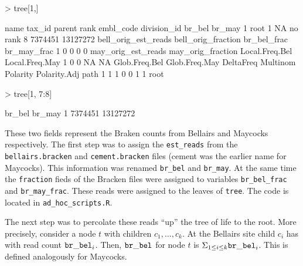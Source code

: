 \documentclass{article}
\begin{document}
\begin{Schunk}
\begin{Sinput}
> tree[1,]
\end{Sinput}
\begin{Soutput}
  name tax_id parent    rank embl_code division_id  br_bel   br_may
1 root      1     NA no rank                     8 7374451 13127272
  bell_orig_est_reads bell_orig_fraction br_bel_frac br_may_frac
1                   0                  0           0           0
  may_orig_est_reads may_orig_fraction Local.Freq.Bel Local.Freq.May
1                  0                 0             NA             NA
  Glob.Freq.Bel Glob.Freq.May DeltaFreq Multinom Polarity Polarity.Adj path
1             1             1         0        0        1            1 root
\end{Soutput}
\begin{Sinput}
> tree[1, 7:8]
\end{Sinput}
\begin{Soutput}
   br_bel   br_may
1 7374451 13127272
\end{Soutput}
\end{Schunk}
These two fields represent the Braken counts from Bellairs and Maycocks respectively. 
The first step was to assign the {\tt est\_reads} from the {\tt bellairs.bracken} and {\tt cement.bracken}
files (cement was the earlier name for Maycocks).
This information was renamed {\tt br\_bel} and {\tt br\_may}.
At the same time the {\tt fraction} fieds of the Bracken files were assigned to variables 
{\tt br\_bel\_frac} and {\tt br\_may\_frac}.
These reads were assigned to the leaves of {\tt tree}.
The code is located in {\tt ad\_hoc\_scripts.R}.

The next step was to percolate these reads ``up'' the tree of life to the root.
More precisely, consider a node $t$ with children $c_1, \ldots, c_k$.
At the Bellairs site child $c_i$ has with read count ${\tt br\_bel}_i$.
Then, ${\tt br\_bel}$ for node $t$ is $\Sigma_{1 \leq i \leq k} {\tt br\_bel}_i$.
This is defined analogously for Maycocks.
\end{document}
